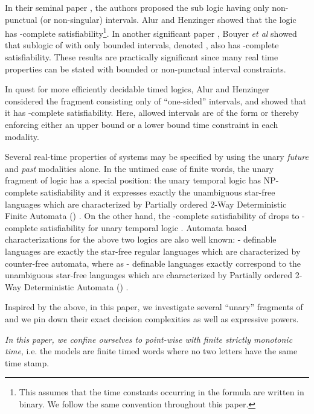 \documentclass{llncs}
\newcommand{\POTDFA}{\mbox{}}
\newcommand{\oomit}[1]{}
\newcommand{\mitlus}{\mbox{}}
\newcommand{\potdfa}{\POTDFA}
\newcommand{\ltlus}{\mbox{}}
\newcommand{\ltlfp}{\mbox{}}
\newcommand{\mitluszinf}{\mbox{}}
\newcommand{\pspace}{\mbox{}}
\newcommand{\expspace}{\mbox{}}
\newcommand{\np}{\mbox{}}
\begin{document}
In their seminal paper \cite{AFH96}, the authors proposed the sub logic  having only non-punctual (or non-singular) intervals.  Alur and Henzinger \cite{AFH96,AH92} showed that the logic \mitlus\/ has \expspace-complete satisfiability\footnote{This assumes that the time constants occurring in the formula are written in binary. We follow the same convention throughout this paper.}. 
In another significant paper \cite{BMOW08}, Bouyer {\em et al} showed that sublogic of  with only bounded intervals, denoted , also has \expspace-complete satisfiability. These results are practically significant since many real time properties can be stated with bounded or non-punctual interval constraints.

In quest for more efficiently decidable timed logics, Alur and Henzinger considered the fragment \mitluszinf\/ consisting only of ``one-sided'' intervals, and showed that it  has \pspace-complete satisfiability. Here, allowed intervals are of the form    or  thereby enforcing either an upper bound or a lower bound time constraint in each modality.  

Several real-time properties of systems may be specified by using the unary \emph{future} and \emph{past} modalities alone. In the untimed case of finite words, the unary fragment of logic \ltlus\/ has a  special position: the  unary temporal logic  has NP-complete satisfiability 
\cite{EVW02} and it expresses exactly the unambiguous star-free languages which are characterized by Partially ordered 2-Way Deterministic Finite Automata (\potdfa) \cite{STV01}. 
On the other hand, the \pspace-complete satisfiability of   drops to \np-complete satisfiability for unary temporal logic \/ \cite{EVW02}.
Automata based characterizations for the above two logics are also well known: \ltlus\/- definable languages are exactly the star-free regular languages  which are characterized by counter-free automata, where as \ltlfp\/- definable languages exactly correspond to the unambiguous star-free languages \cite{TT02} which are characterized by Partially ordered 2-Way Deterministic Automata (\potdfa) \cite{STV01}. 


Inspired by the above, in this paper, we investigate several ``unary'' fragments of \mitlus\/ and we pin down their exact decision complexities as well as expressive powers.
\oomit{
Metric temporal logic can be defined over various classes of time frames, such as point-wise or continuous time. Moreover, the behaviors may be infinite or finite. The decidability and expressiveness of  changes very significantly with the nature of time \cite{OW07,DP07}. }
\emph{In this paper, we confine ourselves to point-wise  with finite strictly monotonic time}, i.e. the models are finite timed words where no two letters have the same time stamp. 
\end{document}
